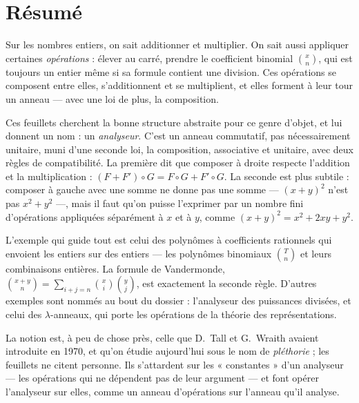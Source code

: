 \documentclass[11pt,a4paper]{article}
\begin{document}
\section*{Résumé}

\begin{resume}
Sur les nombres entiers, on sait additionner et multiplier. On sait aussi
appliquer certaines \emph{opérations} : élever au carré, prendre le coefficient
binomial $\binom{x}{n}$, qui est toujours un entier même si sa formule contient
une division. Ces opérations se composent entre elles, s'additionnent et se
multiplient, et elles forment à leur tour un anneau --- avec une loi de plus, la
composition.

Ces feuillets cherchent la bonne structure abstraite pour ce genre d'objet, et
lui donnent un nom : un \emph{analyseur}. C'est un anneau commutatif, pas
nécessairement unitaire, muni d'une seconde loi, la composition, associative
et unitaire, avec deux règles de compatibilité. La première dit que composer à
droite respecte l'addition et la multiplication : $(F + F') \circ G = F \circ G
+ F' \circ G$. La seconde est plus subtile : composer à gauche avec une somme ne
donne pas une somme --- $(x+y)^{2}$ n'est pas $x^{2} + y^{2}$ ---, mais il faut
qu'on puisse l'exprimer par un nombre fini d'opérations appliquées séparément
à $x$ et à $y$, comme $(x+y)^{2} = x^{2} + 2xy + y^{2}$.

L'exemple qui guide tout est celui des polynômes à coefficients rationnels qui
envoient les entiers sur des entiers --- les polynômes binomiaux $\binom{T}{n}$
et leurs combinaisons entières. La formule de Vandermonde,
$\binom{x+y}{n} = \sum_{i+j=n} \binom{x}{i}\binom{y}{j}$, est exactement la
seconde règle. D'autres exemples sont nommés au bout du dossier : l'analyseur des
puissances divisées, et celui des $\lambda$-anneaux, qui porte les opérations
de la théorie des représentations.

La notion est, à peu de chose près, celle que D.~Tall et G.~Wraith avaient
introduite en 1970, et qu'on étudie aujourd'hui sous le nom de
\emph{pléthorie} ; les feuillets ne citent personne. Ils s'attardent sur les
« constantes » d'un analyseur --- les opérations qui ne dépendent pas de leur
argument --- et font opérer l'analyseur sur elles, comme un anneau d'opérations
sur l'anneau qu'il analyse.

\end{resume}
\end{document}
